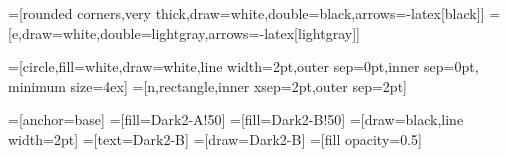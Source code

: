 \usepackage{xcolor}

\usepackage{tikz}
\usetikzlibrary{backgrounds}



=[rounded corners,very thick,draw=white,double=black,arrows={-latex[black]}]
=[e,draw=white,double=lightgray,arrows={-latex[lightgray]}]

=[circle,fill=white,draw=white,line width=2pt,outer sep=0pt,inner sep=0pt, minimum size=4ex]
=[n,rectangle,inner xsep=2pt,outer sep=2pt]

=[anchor=base]
=[fill=Dark2-A!50]
=[fill=Dark2-B!50]
=[draw=black,line width=2pt]
=[text=Dark2-B]
=[draw=Dark2-B]
=[fill opacity=0.5]

\newcommand\innode[ 2 ]{ 
  \begin{tikzpicture}[baseline] 
      \node[inline,inner ysep=0pt,inner xsep=3pt,outer sep=0pt,opacity=0] (n) {#1}; 
      \useasboundingbox (n.north west) rectangle (n.south east);
      \node[n,minimum size=3ex,inner sep=1pt,inline,#2] {#1}; 
  \end{tikzpicture}
  }

\makeatletter
\DeclareRobustCommand{\rvdots}{%
  \vbox{
    \baselineskip4\p@\lineskiplimit\z@
    \kern-\p@
    \hbox{.}\hbox{.}\hbox{.}
  }}
\makeatother